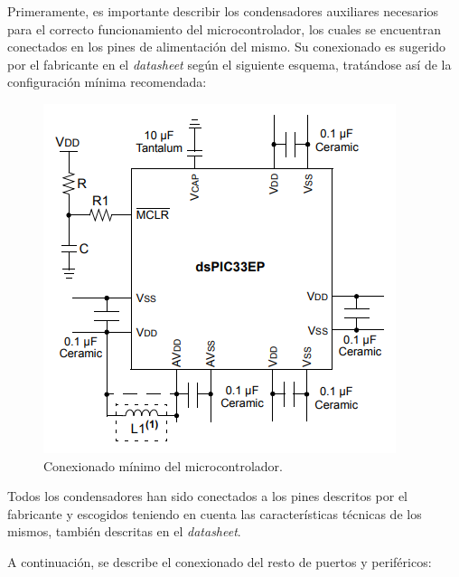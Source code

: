 Primeramente, es importante describir los condensadores auxiliares necesarios para el correcto funcionamiento del microcontrolador, los cuales se encuentran conectados en los pines de alimentación del mismo. Su conexionado es sugerido por el fabricante en el \textit{datasheet} según el siguiente esquema, tratándose así de la configuración mínima recomendada:

\begin{figure}[H]
    \centering 
    \includegraphics[width=.7\linewidth]{pictures/Minimun.PNG}
    \caption{Conexionado mínimo del microcontrolador.}
    \label{fig:CAMBIAR!!!!!!!!!!}
\end{figure}

Todos los condensadores han sido conectados a los pines descritos por el fabricante y escogidos teniendo en cuenta las características técnicas de los mismos, también descritas en el \textit{datasheet}.

A continuación, se describe el conexionado del resto de puertos y periféricos:

